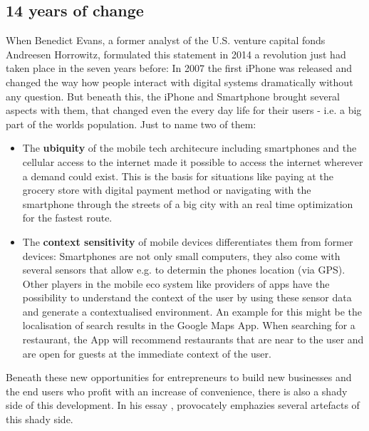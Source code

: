\documentclass[11pt,letterpaper]{article}
\begin{document}
\subsection*{14 years of change}
\begin{center}
 \autocite[][]{evans14}
 \end{center}
When Benedict Evans, a former analyst of the U.S. venture capital fonds Andreesen Horrowitz, formulated this statement in 2014 a revolution just had taken place in the seven years before: In 2007 the first iPhone was released and changed the way how people interact with digital systems dramatically without any question. But beneath this, the iPhone and Smartphone brought several aspects with them, that changed even the every day life for their users - i.e. a big part of the worlds population. Just to name two of them: 
\begin{itemize}
\item 
The \textbf{ubiquity} of the mobile tech architecure including smartphones and the cellular access to the internet made it possible to access the internet wherever a demand could exist. This is the basis for situations like paying at the grocery store with digital payment method or navigating with the smartphone through the streets of a big city with an real time optimization for the fastest route.
\item
The \textbf{context sensitivity} of mobile devices differentiates them from former devices: Smartphones are not only small computers, they also come with several sensors that allow e.g. to determin the phones location (via GPS). Other players in the mobile eco system like providers of apps have the possibility to understand the context of the user by using these sensor data and generate a contextualised environment. An example for this might be the localisation of search results in the Google Maps App. When searching for a restaurant, the App will recommend restaurants that are near to the user and are open for guests at the immediate context of the user.
\end{itemize}

Beneath these new opportunities for entrepreneurs to build new businesses and the end users who profit with an increase of convenience, there is also a shady side of this development. In his essay , \cite[][]{carr08} provocately emphazies several artefacts of this shady side.





\newpage





\printbibliography 
\end{document}
